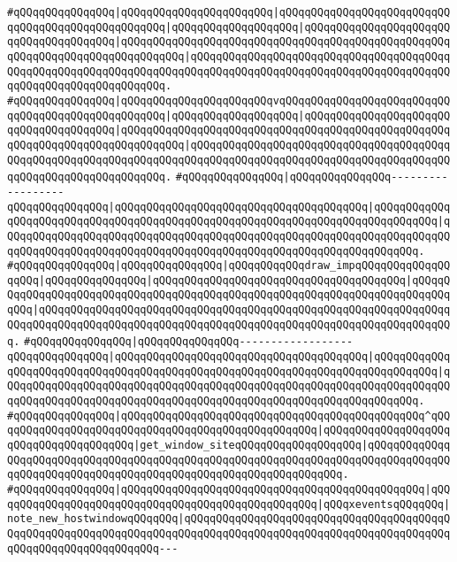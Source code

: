 \verb|#qQQqqQQqqQQqqQQq|\verb#|qQQqqQQqqQQqqQQqqQQqqQQq|qQQqqQQqqQQqqQQqqQQqqQQqqQQqqQQqqQQqqQQqqQQqqQQqqQQq|qQQqqQQqqQQqqQQqqQQq|qQQqqQQqqQQqqQQqqQQqqQQqqQQqqQQqqQQqqQQq|qQQqqQQqqQQqqQQqqQQqqQQqqQQqqQQqqQQqqQQqqQQqqQQqqQQqqQQqqQQqqQQqqQQqqQQqqQQqqQQq|qQQqqQQqqQQqqQQqqQQqqQQqqQQqqQQqqQQqqQQqqQQqqQQqqQQqqQQqqQQqqQQqqQQqqQQqqQQqqQQqqQQqqQQqqQQqqQQqqQQqqQQqqQQqqQQqqQQqqQQqqQQqqQQqqQQqqQQq.#\newline
\verb|#qQQqqQQqqQQqqQQq|\verb#|qQQqqQQqqQQqqQQqqQQqqQQqvqQQqqQQqqQQqqQQqqQQqqQQqqQQqqQQqqQQqqQQqqQQqqQQqqQQq|qQQqqQQqqQQqqQQqqQQq|qQQqqQQqqQQqqQQqqQQqqQQqqQQqqQQqqQQqqQQq|qQQqqQQqqQQqqQQqqQQqqQQqqQQqqQQqqQQqqQQqqQQqqQQqqQQqqQQqqQQqqQQqqQQqqQQqqQQqqQQq|qQQqqQQqqQQqqQQqqQQqqQQqqQQqqQQqqQQqqQQqqQQqqQQqqQQqqQQqqQQqqQQqqQQqqQQqqQQqqQQqqQQqqQQqqQQqqQQqqQQqqQQqqQQqqQQqqQQqqQQqqQQqqQQqqQQqqQQq.#\newline
\verb|#qQQqqQQqqQQqqQQq|\verb#|qQQqqQQqqQQqqQQq------------------qQQqqQQqqQQqqQQq|qQQqqQQqqQQqqQQqqQQqqQQqqQQqqQQqqQQqqQQq|qQQqqQQqqQQqqQQqqQQqqQQqqQQqqQQqqQQqqQQqqQQqqQQqqQQqqQQqqQQqqQQqqQQqqQQqqQQqqQQq|qQQqqQQqqQQqqQQqqQQqqQQqqQQqqQQqqQQqqQQqqQQqqQQqqQQqqQQqqQQqqQQqqQQqqQQqqQQqqQQqqQQqqQQqqQQqqQQqqQQqqQQqqQQqqQQqqQQqqQQqqQQqqQQqqQQqqQQq.#\newline
\verb|#qQQqqQQqqQQqqQQq|\verb#|qQQqqQQqqQQqqQQq|qQQqqQQqqQQqdraw_impqQQqqQQqqQQqqQQqqQQq|qQQqqQQqqQQqqQQq|qQQqqQQqqQQqqQQqqQQqqQQqqQQqqQQqqQQqqQQq|qQQqqQQqqQQqqQQqqQQqqQQqqQQqqQQqqQQqqQQqqQQqqQQqqQQqqQQqqQQqqQQqqQQqqQQqqQQqqQQq|qQQqqQQqqQQqqQQqqQQqqQQqqQQqqQQqqQQqqQQqqQQqqQQqqQQqqQQqqQQqqQQqqQQqqQQqqQQqqQQqqQQqqQQqqQQqqQQqqQQqqQQqqQQqqQQqqQQqqQQqqQQqqQQqqQQqqQQq.#\newline
\verb|#qQQqqQQqqQQqqQQq|\verb#|qQQqqQQqqQQqqQQq------------------qQQqqQQqqQQqqQQq|qQQqqQQqqQQqqQQqqQQqqQQqqQQqqQQqqQQqqQQq|qQQqqQQqqQQqqQQqqQQqqQQqqQQqqQQqqQQqqQQqqQQqqQQqqQQqqQQqqQQqqQQqqQQqqQQqqQQqqQQq|qQQqqQQqqQQqqQQqqQQqqQQqqQQqqQQqqQQqqQQqqQQqqQQqqQQqqQQqqQQqqQQqqQQqqQQqqQQqqQQqqQQqqQQqqQQqqQQqqQQqqQQqqQQqqQQqqQQqqQQqqQQqqQQqqQQqqQQq.#\newline
\verb|#qQQqqQQqqQQqqQQq|\verb#|qQQqqQQqqQQqqQQqqQQqqQQqqQQqqQQqqQQqqQQqqQQqqQQq^qQQqqQQqqQQqqQQqqQQqqQQqqQQqqQQqqQQqqQQqqQQqqQQqqQQq|qQQqqQQqqQQqqQQqqQQqqQQqqQQqqQQqqQQqqQQq|get_window_siteqQQqqQQqqQQqqQQqqQQq|qQQqqQQqqQQqqQQqqQQqqQQqqQQqqQQqqQQqqQQqqQQqqQQqqQQqqQQqqQQqqQQqqQQqqQQqqQQqqQQqqQQqqQQqqQQqqQQqqQQqqQQqqQQqqQQqqQQqqQQqqQQqqQQqqQQqqQQq.#\newline
\verb|#qQQqqQQqqQQqqQQq|\verb#|qQQqqQQqqQQqqQQqqQQqqQQqqQQqqQQqqQQqqQQqqQQqqQQq|qQQqqQQqqQQqqQQqqQQqqQQqqQQqqQQqqQQqqQQqqQQqqQQqqQQq|qQQqxeventsqQQqqQQq|note_new_hostwindowqQQqqQQq|qQQqqQQqqQQqqQQqqQQqqQQqqQQqqQQqqQQqqQQqqQQqqQQqqQQqqQQqqQQqqQQqqQQqqQQqqQQqqQQqqQQqqQQqqQQqqQQqqQQqqQQqqQQqqQQqqQQqqQQqqQQqqQQqqQQqqQQq---#\newline
